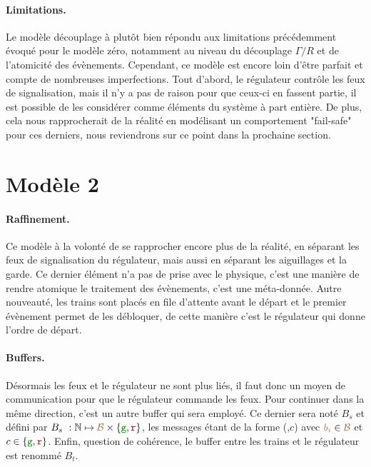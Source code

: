 \documentclass[oneside, a4paper, 11pt]{book}
\newcommand{\nats}{\ensuremath{\mathbb{N}}}
\newcommand{\posFmt}[1]{{\color{poscolor}{#1}}}
\newcommand{\sigred}{{\mbox{${\color{red!50!black}\mathtt{r}}$}}}
\newcommand{\siggreen}{{\mbox{${\color{green!50!black}\mathtt{g}}$}}}
\begin{document}
\paragraph{Limitations.}
Le modèle découplage à plutôt bien répondu aux limitations précédemment évoqué pour le modèle zéro, notamment au niveau du découplage $\Gamma/R$ et de l'atomicité des évènements. Cependant, ce modèle est encore loin d'être parfait et compte de nombreuses imperfections.
Tout d'abord, le régulateur contrôle les feux de signalisation, mais il n'y a pas de raison pour que ceux-ci en fassent partie, il est possible de les considérer comme éléments du système à part entière.
De plus, cela nous rapprocherait de la réalité en modélisant un comportement "fail-safe" pour ces derniers, nous reviendrons sur ce point dans la prochaine section.







\section{Modèle 2}
\paragraph{Raffinement.} Ce modèle à la volonté de se rapprocher encore plus de la réalité, en séparant les feux de signalisation du régulateur, mais aussi en séparant les aiguillages et la garde. Ce dernier élément n'a pas de prise avec le physique, c'est une manière de rendre atomique le traitement des évènements, c'est une méta-donnée.
Autre nouveauté, les trains sont placés en file d'attente avant le départ et le premier évènement permet de les débloquer, de cette manière c'est le régulateur qui donne l'ordre de départ.

\paragraph{Buffers.} Désormais les feux et le régulateur ne sont plus liés, il faut donc un moyen de communication pour que le régulateur commande les feux. Pour continuer dans la même direction, c'est un autre buffer qui sera employé.
Ce dernier sera noté \textbf{$B_s$} et défini par $B_s~: \nats \mapsto \posFmt{\mathcal{B}} \times \{\siggreen, \sigred\}$, les messages étant de la forme (\posFmt{$b_i$},$c$) avec $\posFmt{b_i} \in \posFmt{\mathcal{B}}$ et $c \in \{\siggreen, \sigred\}$.
Enfin, question de cohérence, le buffer entre les trains et le régulateur est renommé \textbf{$B_t$}.
\end{document}
